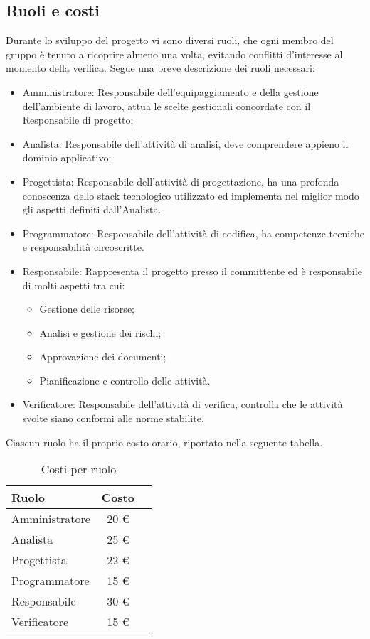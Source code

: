 	\subsection{Ruoli e costi}
	Durante lo sviluppo del progetto vi sono diversi ruoli, che ogni membro del gruppo \GroupName{} è tenuto a ricoprire almeno una volta, evitando conflitti d'interesse al momento della verifica.
	Segue una breve descrizione dei ruoli necessari:
	\begin{itemize}
	\item Amministratore: Responsabile dell'equipaggiamento e della gestione dell'ambiente di lavoro, attua le scelte gestionali concordate con il Responsabile di progetto;
	\item Analista: Responsabile dell'attività di analisi, deve comprendere appieno il dominio applicativo;
	\item Progettista: Responsabile dell'attività di progettazione, ha una profonda conoscenza dello stack tecnologico utilizzato ed implementa nel miglior modo gli aspetti definiti dall'Analista.
	\item Programmatore: Responsabile dell'attività di codifica, ha competenze tecniche e responsabilità circoscritte.
	\item Responsabile: Rappresenta il progetto presso il committente ed è responsabile di molti aspetti tra cui:
	\begin{itemize}
	\item Gestione delle risorse;
	\item Analisi e gestione dei rischi;
	\item Approvazione dei documenti;
	\item Pianificazione e controllo delle attività.
	\end{itemize}
	\item Verificatore: Responsabile dell'attività di verifica, controlla che le attività svolte siano conformi alle norme stabilite.
	\end{itemize}
	Ciascun ruolo ha il proprio costo orario, riportato nella seguente tabella.
	\label{tabellacostiruolo}
	\begin{table}[h]
	\centering
	\begin{tabular}{ l c l }
	\hline
	\textbf{Ruolo} & \textbf{Costo} \\
	\hline
	Amministratore & 20 € \\
	Analista & 25 € \\
	Progettista & 22 € \\
	Programmatore & 15 € \\
	Responsabile & 30 € \\
	Verificatore & 15 €\\
	\hline
	\end{tabular}
	\caption{Costi per ruolo}
	\end{table}


